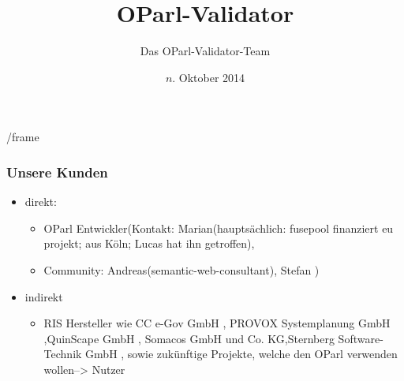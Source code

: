 \documentclass{beamer}
\title{OParl-Validator}
\author{Das OParl-Validator-Team}
\institute{Freie Universität Berlin\\Institut für Informatik}
\date{$n$. Oktober 2014}
\begin{document}
\frame{\titlepage}




/frame{
\frametitle{Unsere Kunden}
    \begin{itemize}[<+->]
        \item direkt: 
        	\begin{itemize}
        		\item OParl Entwickler(Kontakt: Marian(hauptsächlich: fusepool finanziert eu projekt; aus Köln; Lucas hat ihn getroffen),
			\item Community:  Andreas(semantic-web-consultant), Stefan )
        	\end{itemize}
        \item indirekt
        	\begin{itemize}
        		\item RIS Hersteller wie CC e-Gov GmbH , PROVOX Systemplanung GmbH ,QuinScape GmbH , Somacos GmbH und Co. KG,Sternberg Software-Technik GmbH ,
        			sowie zukünftige Projekte, welche den OParl verwenden wollen--> Nutzer 
      		\end{itemize}
      
    \end{itemize}


}
\end{document}
